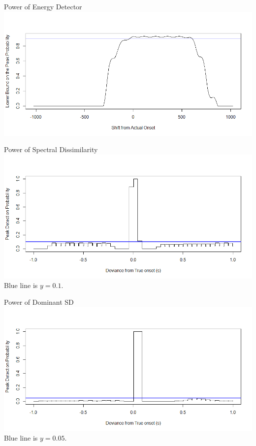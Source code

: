 \documentclass[10pt]{beamer}
\begin{document}


\begin{frame}{Power of Energy Detector}
    \includegraphics[width=\textwidth]{fig/power_energy.png}
\end{frame}

\begin{frame}{Power of Spectral Dissimilarity}
    \includegraphics[width=\textwidth]{fig/power_spectral.png}\\
    Blue line is $y = 0.1$.
\end{frame}

\begin{frame}{Power of Dominant SD}
    \includegraphics[width=\textwidth]{fig/power_dfreq.png}\\
    Blue line is $y = 0.05$.
\end{frame}
\end{document}
